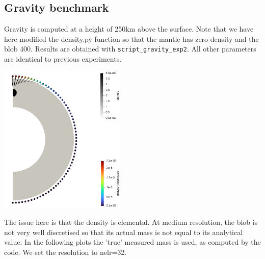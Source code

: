 \newpage
\subsection*{Gravity benchmark}

Gravity is computed at a height of 250km above the surface. 
Note that we have here modified the {\python density.py} function so 
that the mantle has zero density and the blob 400. 
Results are obtained with {\tt script\_gravity\_exp2}.
All other parameters are identical to previous experiments.

\begin{center}
\includegraphics[width=6cm]{python_codes/fieldstone_152/RESULTS/exp2/gravity/gravity.png}
\end{center}

The issue here is that the density is elemental. At medium resolution, the blob is not 
very well discretised so that its actual mass is not equal to its analytical value. 
In the following plots the 'true' measured mass is used, as computed by the code.  
We set the resolution to {\python nelr=32}.

